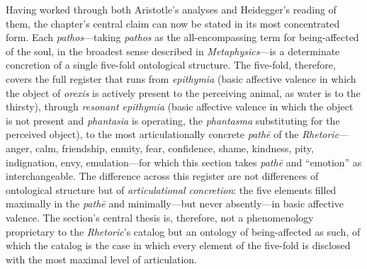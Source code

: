 \documentclass{article}
\begin{document}
Having worked through both Aristotle's analyses and Heidegger's reading of them, the chapter's central claim can now be stated in its most concentrated form. Each \textit{pathos}---taking \textit{pathos} as the all-encompassing term for being-affected of the soul, in the broadest sense described in \textit{Metaphysics}---is a determinate concretion of a single five-fold ontological structure. The five-fold, therefore, covers the full register that runs from \textit{epithymia} (basic affective valence in which the object of \textit{orexis} is actively present to the perceiving animal, as water is to the thirsty), through \textit{resonant epithymia} (basic affective valence in which the object is not present and \textit{phantasia} is operating, the \textit{phantasma} substituting for the perceived object), to the most articulationally concrete \textit{pathē} of the \textit{Rhetoric}---anger, calm, friendship, enmity, fear, confidence, shame, kindness, pity, indignation, envy, emulation---for which this section takes \textit{pathē} and ``emotion'' as interchangeable. The difference across this register are not differences of ontological structure but of \textit{articulational concretion}: the five elements filled maximally in the \textit{pathē} and minimally---but never absently---in basic affective valence. The section's central thesis is, therefore, not a phenomenology proprietary to the \textit{Rhetoric}'s catalog but an ontology of being-affected as such, of which the catalog is the case in which every element of the five-fold is disclosed with the most maximal level of articulation. 
\end{document}

